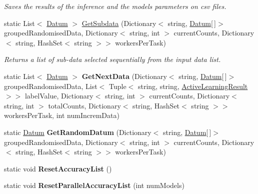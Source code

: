 \begin{DoxyCompactItemize}
\begin{DoxyCompactList}\small\item\em Saves the results of the inference and the model\textquotesingle{}s parameters on csv files. \end{DoxyCompactList}\item 
static List$<$ \hyperlink{class_crowdsourcing_models_1_1_datum}{Datum} $>$ \hyperlink{class_crowdsourcing_models_1_1_active_learning_a0991980eba65da91a31e7273e9fba0a1}{Get\+Subdata} (Dictionary$<$ string, \hyperlink{class_crowdsourcing_models_1_1_datum}{Datum}\mbox{[}$\,$\mbox{]}$>$ grouped\+Randomised\+Data, Dictionary$<$ string, int $>$ current\+Counts, Dictionary$<$ string, Hash\+Set$<$ string $>$$>$ workers\+Per\+Task)
\begin{DoxyCompactList}\small\item\em Returns a list of sub-\/data selected sequentially from the input data list. \end{DoxyCompactList}\item 
\hypertarget{class_crowdsourcing_models_1_1_active_learning_a9681d34ab9a980bd286fb76521c5157c}{}static List$<$ \hyperlink{class_crowdsourcing_models_1_1_datum}{Datum} $>$ {\bfseries Get\+Next\+Data} (Dictionary$<$ string, \hyperlink{class_crowdsourcing_models_1_1_datum}{Datum}\mbox{[}$\,$\mbox{]}$>$ grouped\+Randomised\+Data, List$<$ Tuple$<$ string, string, \hyperlink{class_crowdsourcing_models_1_1_active_learning_result}{Active\+Learning\+Result} $>$$>$ label\+Value, Dictionary$<$ string, int $>$ current\+Counts, Dictionary$<$ string, int $>$ total\+Counts, Dictionary$<$ string, Hash\+Set$<$ string $>$$>$ workers\+Per\+Task, int num\+Increm\+Data)\label{class_crowdsourcing_models_1_1_active_learning_a9681d34ab9a980bd286fb76521c5157c}

\item 
\hypertarget{class_crowdsourcing_models_1_1_active_learning_aa8339fabc81f41dbd42dc8301640278f}{}static \hyperlink{class_crowdsourcing_models_1_1_datum}{Datum} {\bfseries Get\+Random\+Datum} (Dictionary$<$ string, \hyperlink{class_crowdsourcing_models_1_1_datum}{Datum}\mbox{[}$\,$\mbox{]}$>$ grouped\+Randomised\+Data, Dictionary$<$ string, int $>$ current\+Counts, Dictionary$<$ string, Hash\+Set$<$ string $>$$>$ workers\+Per\+Task)\label{class_crowdsourcing_models_1_1_active_learning_aa8339fabc81f41dbd42dc8301640278f}

\item 
\hypertarget{class_crowdsourcing_models_1_1_active_learning_a29d268c3a9bb0896845fedfc82862e08}{}static void {\bfseries Reset\+Accuracy\+List} ()\label{class_crowdsourcing_models_1_1_active_learning_a29d268c3a9bb0896845fedfc82862e08}

\item 
\hypertarget{class_crowdsourcing_models_1_1_active_learning_a20de0eb74a6b5867b1ae98b3a03488e5}{}static void {\bfseries Reset\+Parallel\+Accuracy\+List} (int num\+Models)\label{class_crowdsourcing_models_1_1_active_learning_a20de0eb74a6b5867b1ae98b3a03488e5}

\end{DoxyCompactItemize}
